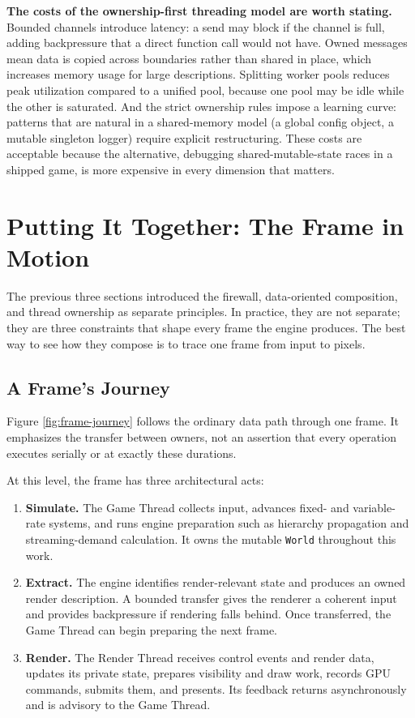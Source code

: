 \documentclass[
  11pt,
  letterpaper,
  DIV=11,
  numbers=noendperiod,
  twoside,
  open=right]{scrreprt}
\begin{document}
\textbf{The costs of the ownership-first threading model are worth
stating.} Bounded channels introduce latency: a send may block if the
channel is full, adding backpressure that a direct function call would
not have. Owned messages mean data is copied across boundaries rather
than shared in place, which increases memory usage for large
descriptions. Splitting worker pools reduces peak utilization compared
to a unified pool, because one pool may be idle while the other is
saturated. And the strict ownership rules impose a learning curve:
patterns that are natural in a shared-memory model (a global config
object, a mutable singleton logger) require explicit restructuring.
These costs are acceptable because the alternative, debugging
shared-mutable-state races in a shipped game, is more expensive in every
dimension that matters.

\section{Putting It Together: The Frame in
Motion}\label{putting-it-together-the-frame-in-motion}

The previous three sections introduced the firewall, data-oriented
composition, and thread ownership as separate principles. In practice,
they are not separate; they are three constraints that shape every frame
the engine produces. The best way to see how they compose is to trace
one frame from input to pixels.

\subsection{A Frame's Journey}\label{a-frames-journey}

Figure \ref{fig:frame-journey} follows the ordinary data path through
one frame. It emphasizes the transfer between owners, not an assertion
that every operation executes serially or at exactly these durations.



At this level, the frame has three architectural acts:

\begin{enumerate}
\def\labelenumi{\arabic{enumi}.}
\item
  \textbf{Simulate.} The Game Thread collects input, advances fixed- and
  variable-rate systems, and runs engine preparation such as hierarchy
  propagation and streaming-demand calculation. It owns the mutable
  \texttt{World} throughout this work.
\item
  \textbf{Extract.} The engine identifies render-relevant state and
  produces an owned render description. A bounded transfer gives the
  renderer a coherent input and provides backpressure if rendering falls
  behind. Once transferred, the Game Thread can begin preparing the next
  frame.
\item
  \textbf{Render.} The Render Thread receives control events and render
  data, updates its private state, prepares visibility and draw work,
  records GPU commands, submits them, and presents. Its feedback returns
  asynchronously and is advisory to the Game Thread.
\end{enumerate}
\end{document}
